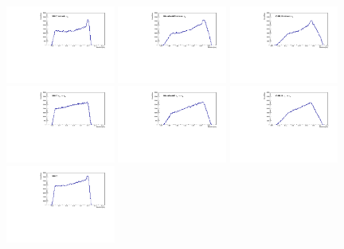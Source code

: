 \begin{figure}[!h]
    \centering
    \includegraphics[width = 0.32\textwidth]{figures-chap5/SBND_intrinsic_nue.pdf}
    \includegraphics[width = 0.32\textwidth]{figures-chap5/MicroBooNE_intrinsic_nue.pdf}
    \includegraphics[width = 0.32\textwidth]{figures-chap5/ICARUS_intrinsic_nue.pdf} 
    \includegraphics[width = 0.32\textwidth]{figures-chap5/SBND_osc.pdf}
    \includegraphics[width = 0.32\textwidth]{figures-chap5/MicroBooNE_osc.pdf}
    \includegraphics[width = 0.32\textwidth]{figures-chap5/ICARUS_osc.pdf}
    \includegraphics[width = 0.32\textwidth]{figures-chap5/SBND_nue.pdf}

\end{figure}
